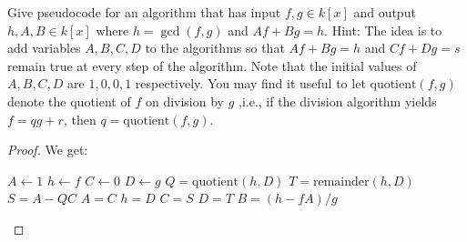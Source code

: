 \begin{exercise}{10}
Give pseudocode for an algorithm that has input $f,g\in k[x]$ and output $h,A,B\in k[x]$ where $h =\gcd(f,g)$ and $Af+Bg=h$. 
Hint: The idea is to add variables $A,B,C,D$ to the algorithms so that $Af+Bg =h$ and $Cf+Dg =s$ remain true at every step of the algorithm. 
Note that the initial values of $A,B,C,D$ are $1,0,0,1$ respectively. 
You may find it useful to let $\text{quotient}(f,g)$ denote the quotient of $f$ on division by $g$ ,i.e., if the division algorithm yields $f =qg+r$, then $q =\text{quotient}(f,g)$.
\end{exercise}
\begin{proof}
We get:
\begin{center}
\begin{algorithmic}
\STATE $A \gets 1$
\STATE $h \gets f$
\STATE $C \gets 0$
\STATE $D\gets g$
    \STATE $Q = \text{quotient}(h,D)$
    \STATE $T = \text{remainder}(h,D)$
    \STATE $S = A - QC$
    \STATE $A = C$
    \STATE $h = D$
    \STATE $C = S$
    \STATE $D = T$
\ENDWHILE
\STATE $B = (h - fA)/g$
\end{algorithmic}
\end{center}
\end{proof}

